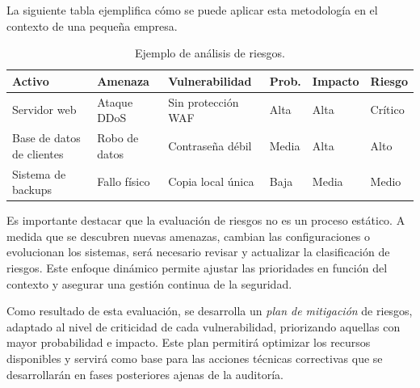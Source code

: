 \documentclass[a4paper, 11pt]{article}
\begin{document}
\vspace{0.3cm}

La siguiente tabla ejemplifica cómo se puede aplicar esta metodología en el contexto de una pequeña empresa.
\vspace{0.3cm}

\begin{table}[H]
\centering
\begin{tabular}{|p{3cm}|p{3cm}|p{3cm}|p{2cm}|p{2cm}|p{2cm}|}
\hline
\rowcolor[HTML]{F4CCCC}
\textbf{Activo} & \textbf{Amenaza} & \textbf{Vulnerabilidad} & \textbf{Prob.} & \textbf{Impacto} & \textbf{Riesgo} \\
\hline
Servidor web & Ataque DDoS & Sin protección WAF & Alta & Alta & Crítico \\
\hline
Base de datos de clientes & Robo de datos & Contraseña débil & Media & Alta & Alto \\
\hline
Sistema de backups & Fallo físico & Copia local única & Baja & Media & Medio \\
\hline
\end{tabular}
\caption{Ejemplo de análisis de riesgos.}
\end{table}




Es importante destacar que la evaluación de riesgos no es un proceso estático. A medida que se descubren nuevas amenazas, 
cambian las configuraciones o evolucionan los sistemas, será necesario revisar y actualizar la clasificación de riesgos. 
Este enfoque dinámico permite ajustar las prioridades en función del contexto y asegurar una gestión continua de la seguridad.




Como resultado de esta evaluación, se desarrolla un \textit{plan de mitigación} de riesgos, adaptado al nivel 
de criticidad de cada vulnerabilidad, priorizando aquellas con mayor probabilidad e impacto. Este plan permitirá optimizar los recursos 
disponibles y servirá como base para las acciones técnicas correctivas que se desarrollarán en fases posteriores ajenas de la auditoría.
\end{document}
